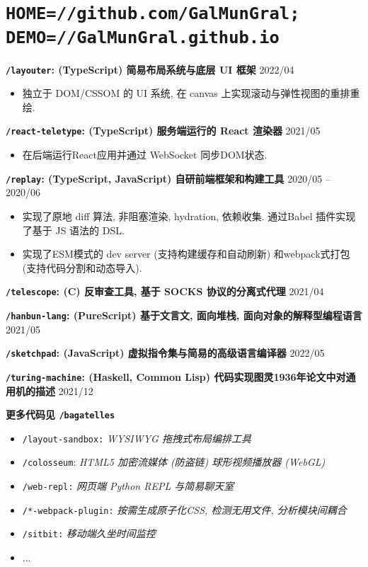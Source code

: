 \documentclass[10pt]{article}
\begin{document}
\section*{\texttt{\large HOME=//github.com/GalMunGral; DEMO=//GalMunGral.github.io}}

\textbf{\texttt{/layouter}: (TypeScript) 简易布局系统与底层 UI 框架}   \hfill 2022/04
\begin{itemize}
\item 独立于 DOM/CSSOM 的 UI 系统, 在 canvas 上实现滚动与弹性视图的重排重绘.
\end{itemize}

\vspace{0.5em}
\textbf{\texttt{/react-teletype}:  (TypeScript) 服务端运行的 React 渲染器} \hfill 2021/05 
\begin{itemize}
\item  在后端运行React应用并通过 WebSocket 同步DOM状态.
\end{itemize}

\vspace{0.5em}
\textbf{\texttt{/replay}: (TypeScript, JavaScript)  自研前端框架和构建工具 } \hfill 2020/05 -- 2020/06
\begin{itemize}
\item 实现了原地 diff 算法, 非阻塞渲染, hydration, 依赖收集. 通过Babel 插件实现了基于 JS 语法的 DSL.
\item 实现了ESM模式的 dev server (支持构建缓存和自动刷新) 和webpack式打包 (支持代码分割和动态导入).
\end{itemize}

\vspace{0.5em}
\textbf{\texttt{/telescope}:  (C) 反审查工具, 基于 SOCKS 协议的分离式代理}   \hfill 2021/04

\vspace{0.5em}
\textbf{\texttt{/hanbun-lang}: (PureScript) 基于文言文, 面向堆栈, 面向对象的解释型编程语言}  \hfill 2021/05

\vspace{0.5em}
\textbf{\texttt{/sketchpad}: (JavaScript) 虚拟指令集与简易的高级语言编译器}  \hfill 2022/05

\vspace{0.5em}
\textbf{\texttt{/turing-machine}:  (Haskell, Common Lisp) 代码实现图灵1936年论文中对通用机的描述} \hfill 2021/12

\vspace{2em}
\textbf{更多代码见 \texttt{/bagatelles}}
\begin{itemize}
\item \texttt{/layout-sandbox:} \textit{WYSIWYG 拖拽式布局编排工具}
\item \texttt{/colosseum}:  \textit{HTML5 加密流媒体 (防盗链) 球形视频播放器 (WebGL)}
\item \texttt{/web-repl:} \textit{网页端 Python REPL 与简易聊天室}
\item \texttt{/*-webpack-plugin:} \textit{按需生成原子化CSS, 检测无用文件, 分析模块间耦合}
\item \texttt{/sitbit:} \textit{移动端久坐时间监控}
\item ...
\end{itemize}
\end{document}
